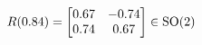 \documentclass[preview]{standalone}
\begin{document}
\begin{align*}
\special{dvisvgm:raw <g id='unique000'>}R(0.84) = \begin{bmatrix} 0.67 & -0.74 \\ 0.74 & 0.67 \end{bmatrix} \in \text{SO}(2)\special{dvisvgm:raw </g>}
\end{align*}
\end{document}
